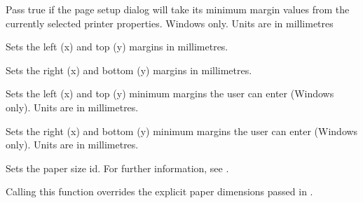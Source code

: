 
Pass true if the page setup dialog will take its minimum margin values from the currently
selected printer properties. Windows only. Units are in millimetres

\label{wxpagesetupdialogdatasetmargintopleft}


Sets the left (x) and top (y) margins in millimetres.

\label{wxpagesetupdialogdatasetmarginbottomright}


Sets the right (x) and bottom (y) margins in millimetres.

\label{wxpagesetupdialogdatasetminmargintopleft}


Sets the left (x) and top (y) minimum margins the user can enter (Windows only). Units are
in millimetres.

\label{wxpagesetupdialogdatasetminmarginbottomright}


Sets the right (x) and bottom (y) minimum margins the user can enter (Windows only). Units are
in millimetres.

\label{wxpagesetupdialogdatasetpaperid}


Sets the paper size id. For further information, see .

Calling this function overrides the explicit paper dimensions passed in .

\label{wxpagesetupdialogdatasetpapersize}


